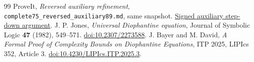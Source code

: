 \documentclass[11pt]{article}
\theoremstyle{remark}\newtheorem{remark}[theorem]{Remark}
\begin{document}
\begin{thebibliography}{99}
 ProveIt, \emph{Reversed auxiliary refinement},
\texttt{complete75\_reversed\_auxiliary89.md}, same snapshot.
\href{https://github.com/VladimirReshetnikov/ProveIt/blob/cdd582bec13f908df3711fa9e05d1ddac368a5db/Computability/HilbertTenthProblem/Papers/research-wip/native-stream-queue/complete75_reversed_auxiliary89.md}{Signed auxiliary step-down argument}.
 J. P. Jones, \emph{Universal Diophantine equation},
Journal of Symbolic Logic \textbf{47} (1982), 549--571.
\href{https://doi.org/10.2307/2273588}{doi:10.2307/2273588}.
 J. Bayer and M. David,
\emph{A Formal Proof of Complexity Bounds on Diophantine Equations},
ITP 2025, LIPIcs 352, Article 3.
\href{https://doi.org/10.4230/LIPIcs.ITP.2025.3}{doi:10.4230/LIPIcs.ITP.2025.3}.
\end{thebibliography}
\end{document}
